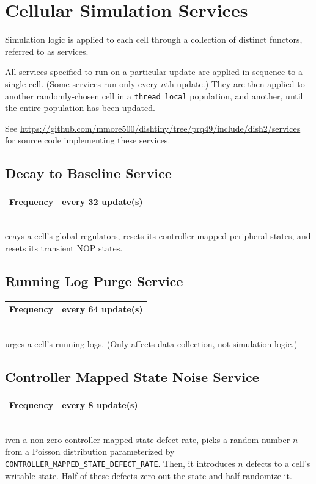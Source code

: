 \newcommand{\cellsimservicedef}[2]{
    \begin{tabular}{|
        >{\columncolor[HTML]{C0C0C0}}l |l|}
        \hline
        Frequency & every #1 update(s) \\ \hline
    \end{tabular} \\
}

\section{Cellular Simulation Services}

Simulation logic is applied to each cell through a collection of distinct functors, referred to as services.

All services specified to run on a particular update are applied in sequence to a single cell.
(Some services run only every $n$th update.)
They are then applied to another randomly-chosen cell in a \texttt{thread\_local} population, and another, until the entire population has been updated.

See \url{https://github.com/mmore500/dishtiny/tree/prq49/include/dish2/services} for source code implementing these services.

\subsection{Decay to Baseline Service}

\cellsimservicedef{32}

Decays a cell's global regulators, resets its controller-mapped peripheral states, and resets its transient NOP states.

\subsection{Running Log Purge Service}

\cellsimservicedef{64}

Purges a cell's running logs.
(Only affects data collection, not simulation logic.)

\subsection{Controller Mapped State Noise Service}

\cellsimservicedef{8}

Given a non-zero controller-mapped state defect rate, picks a random number $n$ from a Poisson distribution parameterized by \texttt{CONTROLLER\_MAPPED\_STATE\_DEFECT\_RATE}.
Then, it introduces $n$ defects to a cell's writable state.
Half of these defects zero out the state and half randomize it.

